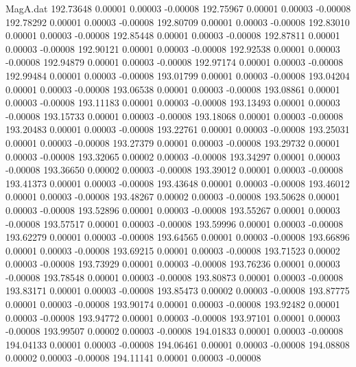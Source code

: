 \begin{filecontents}{MagA.dat}
 192.73648    0.00001    0.00003   -0.00008
 192.75967    0.00001    0.00003   -0.00008
 192.78292    0.00001    0.00003   -0.00008
 192.80709    0.00001    0.00003   -0.00008
 192.83010    0.00001    0.00003   -0.00008
 192.85448    0.00001    0.00003   -0.00008
 192.87811    0.00001    0.00003   -0.00008
 192.90121    0.00001    0.00003   -0.00008
 192.92538    0.00001    0.00003   -0.00008
 192.94879    0.00001    0.00003   -0.00008
 192.97174    0.00001    0.00003   -0.00008
 192.99484    0.00001    0.00003   -0.00008
 193.01799    0.00001    0.00003   -0.00008
 193.04204    0.00001    0.00003   -0.00008
 193.06538    0.00001    0.00003   -0.00008
 193.08861    0.00001    0.00003   -0.00008
 193.11183    0.00001    0.00003   -0.00008
 193.13493    0.00001    0.00003   -0.00008
 193.15733    0.00001    0.00003   -0.00008
 193.18068    0.00001    0.00003   -0.00008
 193.20483    0.00001    0.00003   -0.00008
 193.22761    0.00001    0.00003   -0.00008
 193.25031    0.00001    0.00003   -0.00008
 193.27379    0.00001    0.00003   -0.00008
 193.29732    0.00001    0.00003   -0.00008
 193.32065    0.00002    0.00003   -0.00008
 193.34297    0.00001    0.00003   -0.00008
 193.36650    0.00002    0.00003   -0.00008
 193.39012    0.00001    0.00003   -0.00008
 193.41373    0.00001    0.00003   -0.00008
 193.43648    0.00001    0.00003   -0.00008
 193.46012    0.00001    0.00003   -0.00008
 193.48267    0.00002    0.00003   -0.00008
 193.50628    0.00001    0.00003   -0.00008
 193.52896    0.00001    0.00003   -0.00008
 193.55267    0.00001    0.00003   -0.00008
 193.57517    0.00001    0.00003   -0.00008
 193.59996    0.00001    0.00003   -0.00008
 193.62279    0.00001    0.00003   -0.00008
 193.64565    0.00001    0.00003   -0.00008
 193.66896    0.00001    0.00003   -0.00008
 193.69215    0.00001    0.00003   -0.00008
 193.71523    0.00002    0.00003   -0.00008
 193.73929    0.00001    0.00003   -0.00008
 193.76236    0.00001    0.00003   -0.00008
 193.78548    0.00001    0.00003   -0.00008
 193.80873    0.00001    0.00003   -0.00008
 193.83171    0.00001    0.00003   -0.00008
 193.85473    0.00002    0.00003   -0.00008
 193.87775    0.00001    0.00003   -0.00008
 193.90174    0.00001    0.00003   -0.00008
 193.92482    0.00001    0.00003   -0.00008
 193.94772    0.00001    0.00003   -0.00008
 193.97101    0.00001    0.00003   -0.00008
 193.99507    0.00002    0.00003   -0.00008
 194.01833    0.00001    0.00003   -0.00008
 194.04133    0.00001    0.00003   -0.00008
 194.06461    0.00001    0.00003   -0.00008
 194.08808    0.00002    0.00003   -0.00008
 194.11141    0.00001    0.00003   -0.00008

\end{filecontents}
